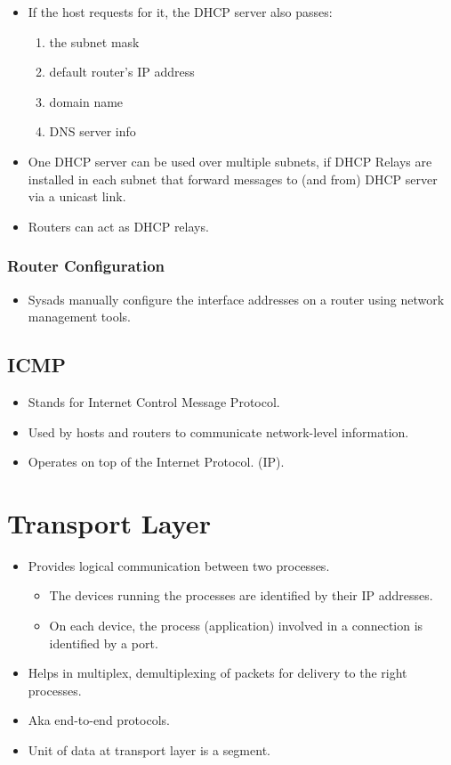 \documentclass{report}
\begin{document}
\begin{itemize}
\item If the host requests for it, the DHCP server also passes:
\label{addinfo}
\begin{enumerate}
    \item the subnet mask
    \item default router's IP address
    \item domain name
    \item DNS server info
\end{enumerate}
\item One DHCP server can be used over multiple subnets, if DHCP Relays are installed in each subnet that forward messages to (and from) DHCP server via a unicast link.
\item Routers can act as DHCP relays.
\end{itemize}
\subsection{Router Configuration}
\begin{itemize}
\item Sysads manually configure the interface addresses on a router using network management tools.
\end{itemize}

\section{ICMP}
\label{sec:icmp}
\begin{itemize}
\item Stands for Internet Control Message Protocol.
\item Used by hosts and routers to communicate network-level information.
\item Operates on top of the Internet Protocol. (IP).
\end{itemize}
\chapter{Transport Layer}
\begin{itemize}
\section{Introduction}
\item Provides logical communication between two processes.
\begin{itemize}
    \item The devices running the processes are identified by their IP addresses.
    \item On each device, the process (application) involved in a connection is identified by a port.
\end{itemize}
\item Helps in multiplex, demultiplexing of packets for delivery to the right processes.
\item Aka end-to-end protocols.
\item Unit of data at transport layer is a segment. 
\end{itemize}
\end{document}
